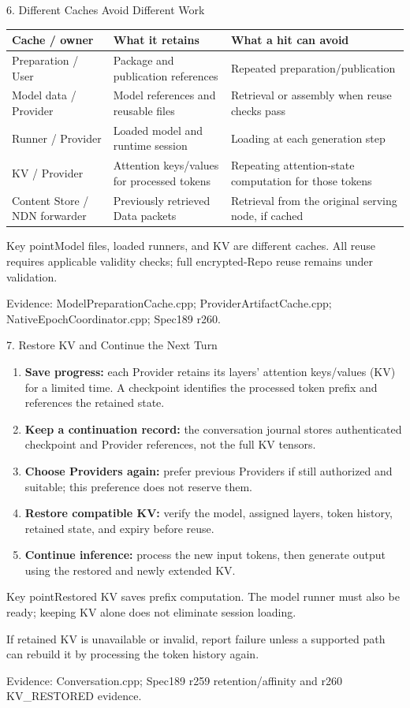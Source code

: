 \documentclass[10pt,aspectratio=169]{beamer}
\newcommand{\src}[1]{\vfill{\fontsize{6.5}{8}\selectfont\color{Gray}Evidence: #1\par}}
\newcommand{\point}[1]{\begin{block}{Key point}\small #1\end{block}}
\begin{document}
\begin{frame}{6. Different Caches Avoid Different Work}
\small\renewcommand{\arraystretch}{1.15}
\begin{tabularx}{\linewidth}{@{}>{\raggedright\arraybackslash}p{31mm}YY@{}}
\toprule\textbf{Cache / owner}&\textbf{What it retains}&\textbf{What a hit can avoid}\\\midrule
Preparation / User&Package and publication references&Repeated preparation/publication\\\midrule
Model data / Provider&Model references and reusable files&Retrieval or assembly when reuse checks pass\\\midrule
Runner / Provider&Loaded model and runtime session&Loading at each generation step\\\midrule
KV / Provider&Attention keys/values for processed tokens&Repeating attention-state computation for those tokens\\\midrule
Content Store / NDN forwarder&Previously retrieved Data packets&Retrieval from the original serving node, if cached\\\bottomrule
\end{tabularx}
\point{Model files, loaded runners, and KV are different caches. All reuse requires applicable validity checks; full encrypted-Repo reuse remains under validation.}
\src{ModelPreparationCache.cpp; ProviderArtifactCache.cpp; NativeEpochCoordinator.cpp; Spec189 r260.}
\end{frame}

\begin{frame}{7. Restore KV and Continue the Next Turn}
\small
\begin{enumerate}
\item \textbf{Save progress:} each Provider retains its layers' attention keys/values (KV) for a limited time. A checkpoint identifies the processed token prefix and references the retained state.
\item \textbf{Keep a continuation record:} the conversation journal stores authenticated checkpoint and Provider references, not the full KV tensors.
\item \textbf{Choose Providers again:} prefer previous Providers if still authorized and suitable; this preference does not reserve them.
\item \textbf{Restore compatible KV:} verify the model, assigned layers, token history, retained state, and expiry before reuse.
\item \textbf{Continue inference:} process the new input tokens, then generate output using the restored and newly extended KV.
\end{enumerate}
\point{Restored KV saves prefix computation. The model runner must also be ready; keeping KV alone does not eliminate session loading.}
\small If retained KV is unavailable or invalid, report failure unless a supported path can rebuild it by processing the token history again.
\src{Conversation.cpp; Spec189 r259 retention/affinity and r260 KV\_RESTORED evidence.}
\end{frame}
\end{document}
